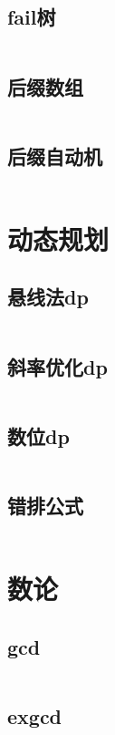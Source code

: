\documentclass[a4paper,11pt]{article}
\begin{document}
\subsection{fail树} 
\inputminted[breaklines]{c++}{字符串/fail树.cpp} 

\subsection{后缀数组} 
\inputminted[breaklines]{c++}{字符串/后缀数组.cpp} 

\subsection{后缀自动机} 
\inputminted[breaklines]{c++}{字符串/后缀自动机.cpp} 

\section{动态规划}
\subsection{悬线法dp} 
\inputminted[breaklines]{c++}{动态规划/悬线法dp.cpp} 

\subsection{斜率优化dp}
\inputminted[breaklines]{c++}{动态规划/斜率优化dp.cpp} 

\subsection{数位dp}
\inputminted[breaklines]{c++}{动态规划/数位dp.cpp} 

\subsection{错排公式}
\inputminted[breaklines]{c++}{动态规划/错排公式.cpp} 

\section{数论} 

\subsection{gcd} 
\inputminted[breaklines]{c++}{数论/gcd.cpp}

\subsection{exgcd} 
\inputminted[breaklines]{c++}{数论/exgcd.cpp}
\end{document}
